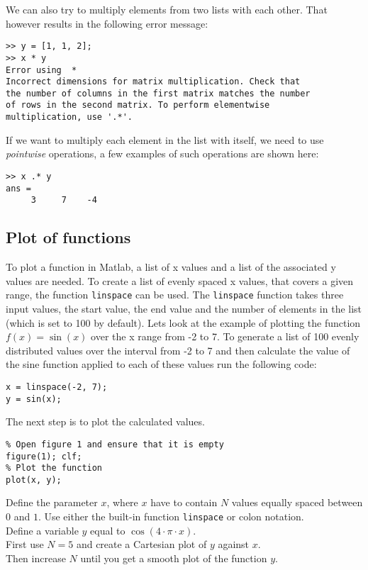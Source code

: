 We can also try to multiply elements from two lists with each other.
That however results in the following error message:
\begin{lstlisting}
>> y = [1, 1, 2];
>> x * y
Error using  * 
Incorrect dimensions for matrix multiplication. Check that 
the number of columns in the first matrix matches the number 
of rows in the second matrix. To perform elementwise 
multiplication, use '.*'.
\end{lstlisting}

If we want to multiply each element in the list with itself, we need to use \emph{pointwise} 
operations, a few examples of such operations are shown here:
\begin{lstlisting}
>> x .* y
ans = 
     3     7    -4
\end{lstlisting}




\subsection{Plot of functions}

To plot a function in Matlab, a list of x values and a list of the associated y 
values are needed.
To create a list of evenly spaced x values, that covers a given range, the function
\verb!linspace! can be used.
The \verb!linspace! function takes three input values, the start value, 
the end value and the number of elements in the list (which is set to 100 
by default).
Lets look at the example of plotting the function $f(x) = \sin(x)$ over the x range 
from -2 to 7.
To generate a list of 100 evenly distributed values over the interval from -2 to 7
and then calculate the value of the sine function applied to each of these values
run the following code:
\begin{lstlisting}
x = linspace(-2, 7);
y = sin(x);
\end{lstlisting}
The next step is to plot the calculated values.
\begin{lstlisting}
% Open figure 1 and ensure that it is empty
figure(1); clf;
% Plot the function
plot(x, y);
\end{lstlisting}


\begin{ex}
Define the parameter $x$, where $x$ have to contain $N$ values equally spaced between $0$
and $1$. Use either the built-in function \texttt{linspace} or colon notation.\\
Define a variable $y$ equal to $\cos(4\cdot \pi \cdot x)$.\\
First use $N = 5$ and create a Cartesian plot of $y$ against $x$.\\
Then increase $N$ until you get a smooth plot of the function $y$.
\end{ex}

